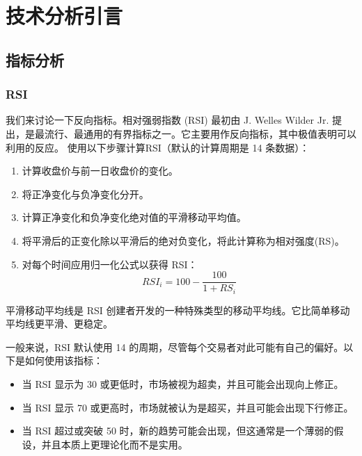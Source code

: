 \chapter{技术分析引言}
\section{指标分析}
\subsection{RSI}
我们来讨论一下反向指标。相对强弱指数 (RSI) 最初由 J. Welles Wilder Jr. 提出，是最流行、最通用的有界指标之一。它主要用作反向指标，其中极值表明可以利用的反应。
使用以下步骤计算RSI（默认的计算周期是 14 条数据）：
\begin{enumerate}
    \item 计算收盘价与前一日收盘价的变化。
    \item 将正净变化与负净变化分开。
    \item 计算正净变化和负净变化绝对值的平滑移动平均值。
    \item 将平滑后的正变化除以平滑后的绝对负变化，将此计算称为相对强度(RS)。
    \item 对每个时间应用归一化公式以获得 RSI：
          \begin{equation}
              RSI_i = 100 -\frac{100}{1 + RS_i}
          \end{equation}
\end{enumerate}

\begin{tcolorbox}
    平滑移动平均线是 RSI 创建者开发的一种特殊类型的移动平均线。它比简单移动平均线更平滑、更稳定。
\end{tcolorbox}

一般来说，RSI 默认使用 14 的周期，尽管每个交易者对此可能有自己的偏好。以下是如何使用该指标：
\begin{itemize}
    \item 当 RSI 显示为 30 或更低时，市场被视为超卖，并且可能会出现向上修正。
    \item 当 RSI 显示 70 或更高时，市场就被认为是超买，并且可能会出现下行修正。
    \item 当 RSI 超过或突破 50 时，新的趋势可能会出现，但这通常是一个薄弱的假设，并且本质上更理论化而不是实用。
\end{itemize}